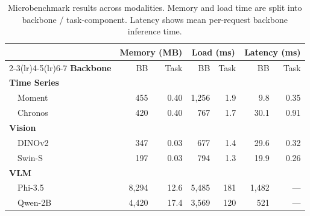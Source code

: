 \begin{table}[t]
\centering
\caption{Microbenchmark results across modalities.
  Memory and load time are split into backbone / task-component.
  Latency shows mean per-request backbone inference time.}
\label{tab:microbenchmark}
\setlength{\tabcolsep}{3pt}
\footnotesize
\begin{tabular}{lrrrrrr}
\toprule
& \multicolumn{2}{c}{\textbf{Memory (MB)}} & \multicolumn{2}{c}{\textbf{Load (ms)}} & \multicolumn{2}{c}{\textbf{Latency (ms)}} \\
\cmidrule(lr){2-3}\cmidrule(lr){4-5}\cmidrule(lr){6-7}
\textbf{Backbone} & BB & Task & BB & Task & BB & Task \\
\midrule
\textbf{Time Series} \\
~~Moment    & 455      & 0.40 & 1{,}256 &   1.9 &   9.8 & 0.35 \\
~~Chronos   & 420      & 0.40 &    767  &   1.7 &  30.1 & 0.91 \\
\midrule
\textbf{Vision} \\
~~DINOv2    & 347      & 0.03 &    677  &   1.4 &  29.6 & 0.32 \\
~~Swin-S    & 197      & 0.03 &    794  &   1.3 &  19.9 & 0.26 \\
\midrule
\textbf{VLM} \\
~~Phi-3.5   & 8{,}294  & 12.6 & 5{,}485 & 181   & 1{,}482 & ---  \\
~~Qwen-2B   & 4{,}420  & 17.4 & 3{,}569 & 120   &    521  & ---  \\
\bottomrule
\end{tabular}
\end{table}
